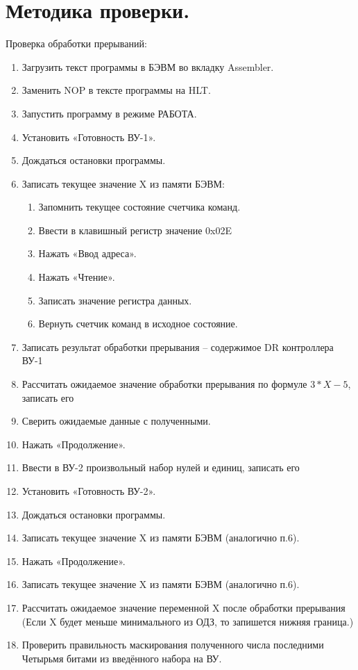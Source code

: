 \section{Методика проверки.}
Проверка обработки прерываний:
\begin{enumerate}
    \item Загрузить текст программы в БЭВМ во вкладку Assembler.
    \item Заменить NOP в тексте программы на HLT.
    \item Запустить программу в режиме РАБОТА.
    \item Установить «Готовность ВУ-1».
    \item Дождаться остановки программы.
    \item Записать текущее значение X из памяти БЭВМ:
    \begin{enumerate}
        \item Запомнить текущее состояние счетчика команд.
        \item Ввести в клавишный регистр значение 0x02E
        \item Нажать «Ввод адреса».
        \item Нажать «Чтение».
        \item Записать значение регистра данных.
        \item Вернуть счетчик команд в исходное состояние.
    \end{enumerate}
    \item  Записать результат обработки прерывания – содержимое DR контроллера ВУ-1
    \item Рассчитать ожидаемое значение обработки прерывания по формуле $3*X-5$, записать его
    \item Сверить ожидаемые данные с полученными.
    \item Нажать «Продолжение».
    \item Ввести в ВУ-2 произвольный набор нулей и единиц, записать его
    \item Установить «Готовность ВУ-2».
    \item Дождаться остановки программы.
    \item Записать текущее значение X из памяти БЭВМ (аналогично п.6).
    \item Нажать «Продолжение».
    \item Записать текущее значение X из памяти БЭВМ (аналогично п.6).
    \item Рассчитать ожидаемое значение переменной X после обработки прерывания \\
    (Если X будет меньше минимального из ОДЗ, то запишется нижняя граница.)
    \item Проверить правильность маскирования полученного числа последними\\
    Четырьмя битами из введённого набора на ВУ.
\end{enumerate}
